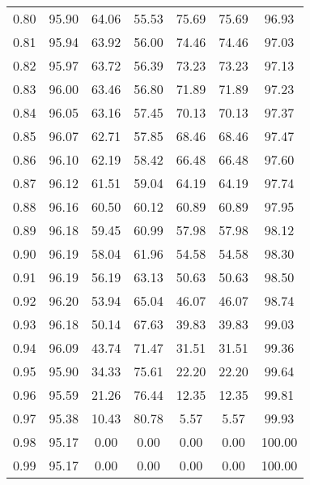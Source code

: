 \begin{tabular}{|c|c|c|c|c|c|c|}
      0.80 &     95.90 &     64.06 &      55.53 &   75.69 &      75.69 &         96.93 \\
      0.81 &     95.94 &     63.92 &      56.00 &   74.46 &      74.46 &         97.03 \\
      0.82 &     95.97 &     63.72 &      56.39 &   73.23 &      73.23 &         97.13 \\
      0.83 &     96.00 &     63.46 &      56.80 &   71.89 &      71.89 &         97.23 \\
      0.84 &     96.05 &     63.16 &      57.45 &   70.13 &      70.13 &         97.37 \\
      0.85 &     96.07 &     62.71 &      57.85 &   68.46 &      68.46 &         97.47 \\
      0.86 &     96.10 &     62.19 &      58.42 &   66.48 &      66.48 &         97.60 \\
      0.87 &     96.12 &     61.51 &      59.04 &   64.19 &      64.19 &         97.74 \\
      0.88 &     96.16 &     60.50 &      60.12 &   60.89 &      60.89 &         97.95 \\
      0.89 &     96.18 &     59.45 &      60.99 &   57.98 &      57.98 &         98.12 \\
      0.90 &     96.19 &     58.04 &      61.96 &   54.58 &      54.58 &         98.30 \\
      0.91 &     96.19 &     56.19 &      63.13 &   50.63 &      50.63 &         98.50 \\
      0.92 &     96.20 &     53.94 &      65.04 &   46.07 &      46.07 &         98.74 \\
      0.93 &     96.18 &     50.14 &      67.63 &   39.83 &      39.83 &         99.03 \\
      0.94 &     96.09 &     43.74 &      71.47 &   31.51 &      31.51 &         99.36 \\
      0.95 &     95.90 &     34.33 &      75.61 &   22.20 &      22.20 &         99.64 \\
      0.96 &     95.59 &     21.26 &      76.44 &   12.35 &      12.35 &         99.81 \\
      0.97 &     95.38 &     10.43 &      80.78 &    5.57 &       5.57 &         99.93 \\
      0.98 &     95.17 &      0.00 &       0.00 &    0.00 &       0.00 &        100.00 \\
      0.99 &     95.17 &      0.00 &       0.00 &    0.00 &       0.00 &        100.00 \\
\bottomrule
\end{tabular}
